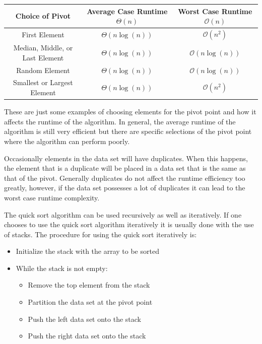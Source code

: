 \documentclass[a4paper,9pt]{article}
\begin{document}
\begin{center}
    \begin{tabular}{|c|c|c|}
        \hline \textbf{Choice of Pivot} & \textbf{Average Case Runtime $\Theta(n)$} & \textbf{Worst Case Runtime $\mathcal{O}(n)$} \\ \hline
        First Element & $\Theta(n\log{(n)})$ & $\mathcal{O}(n^2)$ \\ \hline
        Median, Middle, or Last Element & $\Theta(n\log{(n)})$ & $\mathcal{O}(n\log{(n)})$ \\ \hline
        Random Element & $\Theta(n\log{(n)})$ & $\mathcal{O}(n\log{(n)})$ \\ \hline
        Smallest or Largest Element & $\Theta(n\log{(n)})$ & $\mathcal{O}(n^2)$ \\ \hline
    \end{tabular}
\end{center}

\noindent These are just some examples of choosing elements for the pivot point and how it affects the runtime of the algorithm. In general, the average runtime of the algorithm is still very efficient but there are specific selections of the pivot point where the algorithm can perform poorly.

Occasionally elements in the data set will have duplicates. When this happens, the element that is a duplicate will be placed in a data set that is the same as that of the pivot. Generally duplicates do not affect the runtime efficiency too greatly, however, if the data set possesses a lot of duplicates it can lead to the worst case runtime complexity.

The quick sort algorithm can be used recursively as well as iteratively. If one chooses to use the quick sort algorithm iteratively it is usually done with the use of stacks. The procedure for using the quick sort iteratively is:

\begin{itemize}
    \item Initialize the stack with the array to be sorted
    \item While the stack is not empty:
    \begin{itemize}
        \item Remove the top element from the stack
        \item Partition the data set at the pivot point
        \item Push the left data set onto the stack
        \item Push the right data set onto the stack
    \end{itemize}
\end{itemize}
\end{document}
